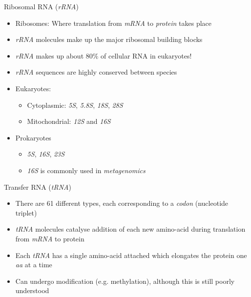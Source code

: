 \documentclass[aspectratio=169,11pt]{beamer}
\begin{document}
\begin{frame}{Ribosomal RNA (\textit{rRNA})}

	\begin{itemize}
	\item Ribosomes: Where translation from \textit{mRNA} to \textit{protein} takes place
		\item \textit{rRNA} molecules make up the major ribosomal building blocks
		\item \textit{rRNA} makes up about 80\% of cellular RNA in eukaryotes!
		\item \textit{rRNA} sequences are highly conserved between species
		\item Eukaryotes:
		\begin{itemize}
			\item Cytoplasmic: \textit{5S}, \textit{5.8S}, \textit{18S}, \textit{28S}
			\item Mitochondrial: \textit{12S} and \textit{16S}
		\end{itemize}
		
		\item Prokaryotes
		\begin{itemize}
			\item \textit{5S}, \textit{16S}, \textit{23S}
			\item \textit{16S} is commonly used in \textit{metagenomics}
		\end{itemize}

	\end{itemize}

\end{frame}

\begin{frame}{Transfer RNA (\textit{tRNA})}

	\begin{itemize}
		\item There are 61 different types, each corresponding to a \textit{codon} (nucleotide triplet)
		\item \textit{tRNA} molecules catalyse addition of each new amino-acid during translation from \textit{mRNA} to protein
		\item Each \textit{tRNA} has a single amino-acid attached which elongates the protein one \textit{aa} at a time
		\item Can undergo modification (e.g. methylation), although this is still poorly understood
	\end{itemize}

\end{frame}
\end{document}
